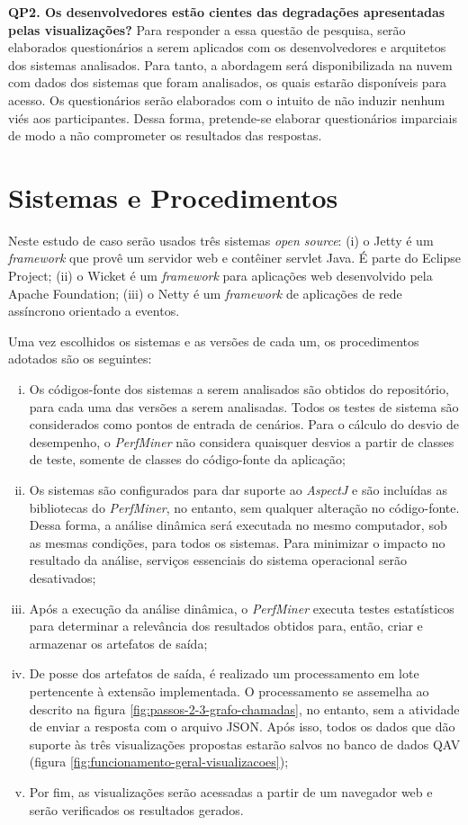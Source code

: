 \textbf{QP2. Os desenvolvedores estão cientes das degradações apresentadas pelas visualizações?} Para responder a essa questão de pesquisa, serão elaborados questionários a serem aplicados com os desenvolvedores e arquitetos dos sistemas analisados. Para tanto, a abordagem será disponibilizada na nuvem com dados dos sistemas que foram analisados, os quais estarão disponíveis para acesso. Os questionários serão elaborados com o intuito de não induzir nenhum viés aos participantes. Dessa forma, pretende-se elaborar questionários imparciais de modo a não comprometer os resultados das respostas.

\section{Sistemas e Procedimentos} \label{sec:sistemas-procedimentos}

Neste estudo de caso serão usados três sistemas \textit{open source}: (i) o Jetty \cite{Jetty2016} é um \textit{framework} que provê um servidor web e contêiner servlet Java. É parte do Eclipse Project; (ii) o Wicket \cite{ApacheWi} é um \textit{framework} para aplicações web desenvolvido pela Apache Foundation; (iii) o Netty \cite{Netty2016} é um \textit{framework} de aplicações de rede assíncrono orientado a eventos.

Uma vez escolhidos os sistemas e as versões de cada um, os procedimentos adotados são os seguintes:
\begin{enumerate}[(i)]
	\item Os códigos-fonte dos sistemas a serem analisados são obtidos do repositório, para cada uma das versões a serem analisadas. Todos os testes de sistema são considerados como pontos de entrada de cenários. Para o cálculo do desvio de desempenho, o \textit{PerfMiner} não considera quaisquer desvios a partir de classes de teste, somente de classes do código-fonte da aplicação;
	\item Os sistemas são configurados para dar suporte ao \textit{AspectJ} e são incluídas as bibliotecas do \textit{PerfMiner}, no entanto, sem qualquer alteração no código-fonte. Dessa forma, a análise dinâmica será executada no mesmo computador, sob as mesmas condições, para todos os sistemas. Para minimizar o impacto no resultado da análise, serviços essenciais do sistema operacional serão desativados;
	\item Após a execução da análise dinâmica, o \textit{PerfMiner} executa testes estatísticos para determinar a relevância dos resultados obtidos para, então, criar e armazenar os artefatos de saída;
	\item De posse dos artefatos de saída, é realizado um processamento em lote pertencente à extensão implementada. O processamento se assemelha ao descrito na figura \ref{fig:passos-2-3-grafo-chamadas}, no entanto, sem a atividade de enviar a resposta com o arquivo JSON. Após isso, todos os dados que dão suporte às três visualizações propostas estarão salvos no banco de dados QAV (figura \ref{fig:funcionamento-geral-visualizacoes});
	\item Por fim, as visualizações serão acessadas a partir de um navegador web e serão verificados os resultados gerados.
\end{enumerate}

